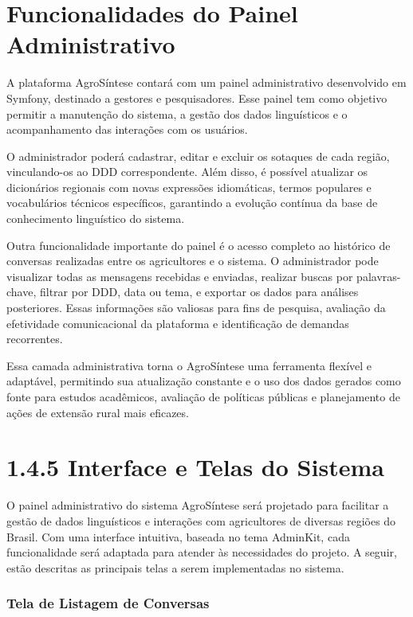 \section{Funcionalidades do Painel Administrativo}

A plataforma AgroSíntese contará com um painel administrativo desenvolvido em Symfony, destinado a gestores e pesquisadores. Esse painel tem como objetivo permitir a manutenção do sistema, a gestão dos dados linguísticos e o acompanhamento das interações com os usuários.

O administrador poderá cadastrar, editar e excluir os sotaques de cada região, vinculando-os ao DDD correspondente. Além disso, é possível atualizar os dicionários regionais com novas expressões idiomáticas, termos populares e vocabulários técnicos específicos, garantindo a evolução contínua da base de conhecimento linguístico do sistema.

Outra funcionalidade importante do painel é o acesso completo ao histórico de conversas realizadas entre os agricultores e o sistema. O administrador pode visualizar todas as mensagens recebidas e enviadas, realizar buscas por palavras-chave, filtrar por DDD, data ou tema, e exportar os dados para análises posteriores. Essas informações são valiosas para fins de pesquisa, avaliação da efetividade comunicacional da plataforma e identificação de demandas recorrentes.

Essa camada administrativa torna o AgroSíntese uma ferramenta flexível e adaptável, permitindo sua atualização constante e o uso dos dados gerados como fonte para estudos acadêmicos, avaliação de políticas públicas e planejamento de ações de extensão rural mais eficazes.

\section{1.4.5 Interface e Telas do Sistema}

O painel administrativo do sistema AgroSíntese será projetado para facilitar a gestão de dados linguísticos e interações com agricultores de diversas regiões do Brasil. Com uma interface intuitiva, baseada no tema AdminKit, cada funcionalidade será adaptada para atender às necessidades do projeto. A seguir, estão descritas as principais telas a serem implementadas no sistema.

\subsubsection*{Tela de Listagem de Conversas}

